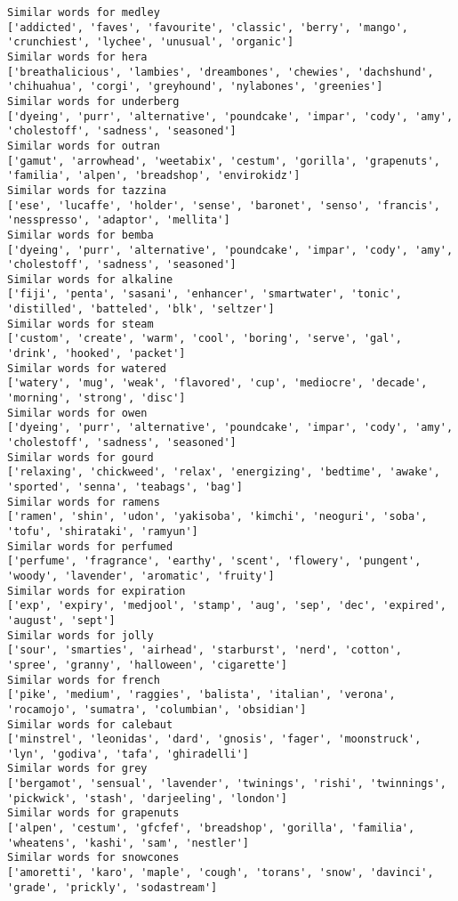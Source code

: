 \documentclass[11pt]{article}
\begin{document}
\begin{Verbatim}[commandchars=\\\{\}]
Similar words for medley
['addicted', 'faves', 'favourite', 'classic', 'berry', 'mango', 'crunchiest', 'lychee', 'unusual', 'organic']
Similar words for hera
['breathalicious', 'lambies', 'dreambones', 'chewies', 'dachshund', 'chihuahua', 'corgi', 'greyhound', 'nylabones', 'greenies']
Similar words for underberg
['dyeing', 'purr', 'alternative', 'poundcake', 'impar', 'cody', 'amy', 'cholestoff', 'sadness', 'seasoned']
Similar words for outran
['gamut', 'arrowhead', 'weetabix', 'cestum', 'gorilla', 'grapenuts', 'familia', 'alpen', 'breadshop', 'envirokidz']
Similar words for tazzina
['ese', 'lucaffe', 'holder', 'sense', 'baronet', 'senso', 'francis', 'nesspresso', 'adaptor', 'mellita']
Similar words for bemba
['dyeing', 'purr', 'alternative', 'poundcake', 'impar', 'cody', 'amy', 'cholestoff', 'sadness', 'seasoned']
Similar words for alkaline
['fiji', 'penta', 'sasani', 'enhancer', 'smartwater', 'tonic', 'distilled', 'batteled', 'blk', 'seltzer']
Similar words for steam
['custom', 'create', 'warm', 'cool', 'boring', 'serve', 'gal', 'drink', 'hooked', 'packet']
Similar words for watered
['watery', 'mug', 'weak', 'flavored', 'cup', 'mediocre', 'decade', 'morning', 'strong', 'disc']
Similar words for owen
['dyeing', 'purr', 'alternative', 'poundcake', 'impar', 'cody', 'amy', 'cholestoff', 'sadness', 'seasoned']
Similar words for gourd
['relaxing', 'chickweed', 'relax', 'energizing', 'bedtime', 'awake', 'sported', 'senna', 'teabags', 'bag']
Similar words for ramens
['ramen', 'shin', 'udon', 'yakisoba', 'kimchi', 'neoguri', 'soba', 'tofu', 'shirataki', 'ramyun']
Similar words for perfumed
['perfume', 'fragrance', 'earthy', 'scent', 'flowery', 'pungent', 'woody', 'lavender', 'aromatic', 'fruity']
Similar words for expiration
['exp', 'expiry', 'medjool', 'stamp', 'aug', 'sep', 'dec', 'expired', 'august', 'sept']
Similar words for jolly
['sour', 'smarties', 'airhead', 'starburst', 'nerd', 'cotton', 'spree', 'granny', 'halloween', 'cigarette']
Similar words for french
['pike', 'medium', 'raggies', 'balista', 'italian', 'verona', 'rocamojo', 'sumatra', 'columbian', 'obsidian']
Similar words for calebaut
['minstrel', 'leonidas', 'dard', 'gnosis', 'fager', 'moonstruck', 'lyn', 'godiva', 'tafa', 'ghiradelli']
Similar words for grey
['bergamot', 'sensual', 'lavender', 'twinings', 'rishi', 'twinnings', 'pickwick', 'stash', 'darjeeling', 'london']
Similar words for grapenuts
['alpen', 'cestum', 'gfcfef', 'breadshop', 'gorilla', 'familia', 'wheatens', 'kashi', 'sam', 'nestler']
Similar words for snowcones
['amoretti', 'karo', 'maple', 'cough', 'torans', 'snow', 'davinci', 'grade', 'prickly', 'sodastream']

\end{Verbatim}
\end{document}
